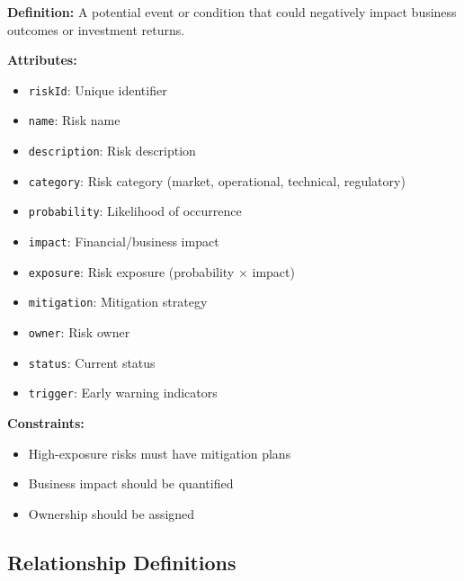 \documentclass[11pt,letterpaper]{article}
\begin{document}
\begin{definitionbox}
\textbf{Definition:} A potential event or condition that could negatively impact business outcomes or investment returns.

\textbf{Attributes:}
\begin{itemize}[nosep]
    \item \texttt{riskId}: Unique identifier
    \item \texttt{name}: Risk name
    \item \texttt{description}: Risk description
    \item \texttt{category}: Risk category (market, operational, technical, regulatory)
    \item \texttt{probability}: Likelihood of occurrence
    \item \texttt{impact}: Financial/business impact
    \item \texttt{exposure}: Risk exposure (probability $\times$ impact)
    \item \texttt{mitigation}: Mitigation strategy
    \item \texttt{owner}: Risk owner
    \item \texttt{status}: Current status
    \item \texttt{trigger}: Early warning indicators
\end{itemize}

\textbf{Constraints:}
\begin{itemize}[nosep]
    \item High-exposure risks must have mitigation plans
    \item Business impact should be quantified
    \item Ownership should be assigned
\end{itemize}
\end{definitionbox}

\subsection{Relationship Definitions}
\end{document}
